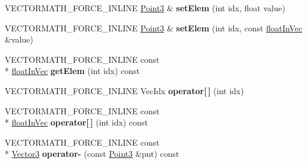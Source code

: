 \begin{DoxyCompactItemize}
\item 
\hypertarget{class_vectormath_1_1_aos_1_1_point3_ac8c59a40c872e7ead9fb897c3dc012fb}{V\+E\+C\+T\+O\+R\+M\+A\+T\+H\+\_\+\+F\+O\+R\+C\+E\+\_\+\+I\+N\+L\+I\+N\+E \hyperlink{class_vectormath_1_1_aos_1_1_point3}{Point3} \& {\bfseries set\+Elem} (int idx, float value)}\label{class_vectormath_1_1_aos_1_1_point3_ac8c59a40c872e7ead9fb897c3dc012fb}

\item 
\hypertarget{class_vectormath_1_1_aos_1_1_point3_acfaace337e3c100a7f36cdd336409634}{V\+E\+C\+T\+O\+R\+M\+A\+T\+H\+\_\+\+F\+O\+R\+C\+E\+\_\+\+I\+N\+L\+I\+N\+E \hyperlink{class_vectormath_1_1_aos_1_1_point3}{Point3} \& {\bfseries set\+Elem} (int idx, const \hyperlink{class_vectormath_1_1float_in_vec}{float\+In\+Vec} \&value)}\label{class_vectormath_1_1_aos_1_1_point3_acfaace337e3c100a7f36cdd336409634}

\item 
\hypertarget{class_vectormath_1_1_aos_1_1_point3_afb80aeb72784595b6beb84a09ad236bd}{V\+E\+C\+T\+O\+R\+M\+A\+T\+H\+\_\+\+F\+O\+R\+C\+E\+\_\+\+I\+N\+L\+I\+N\+E const \\*
\hyperlink{class_vectormath_1_1float_in_vec}{float\+In\+Vec} {\bfseries get\+Elem} (int idx) const }\label{class_vectormath_1_1_aos_1_1_point3_afb80aeb72784595b6beb84a09ad236bd}

\item 
\hypertarget{class_vectormath_1_1_aos_1_1_point3_aed1afecf3d4ac78dd3287f93eb548f8a}{V\+E\+C\+T\+O\+R\+M\+A\+T\+H\+\_\+\+F\+O\+R\+C\+E\+\_\+\+I\+N\+L\+I\+N\+E Vec\+Idx {\bfseries operator\mbox{[}$\,$\mbox{]}} (int idx)}\label{class_vectormath_1_1_aos_1_1_point3_aed1afecf3d4ac78dd3287f93eb548f8a}

\item 
\hypertarget{class_vectormath_1_1_aos_1_1_point3_a18475404c76492a1c0fd5b951942f356}{V\+E\+C\+T\+O\+R\+M\+A\+T\+H\+\_\+\+F\+O\+R\+C\+E\+\_\+\+I\+N\+L\+I\+N\+E const \\*
\hyperlink{class_vectormath_1_1float_in_vec}{float\+In\+Vec} {\bfseries operator\mbox{[}$\,$\mbox{]}} (int idx) const }\label{class_vectormath_1_1_aos_1_1_point3_a18475404c76492a1c0fd5b951942f356}

\item 
\hypertarget{class_vectormath_1_1_aos_1_1_point3_a07f2ca2ead80c0ad5e3e6580ac7a3c81}{V\+E\+C\+T\+O\+R\+M\+A\+T\+H\+\_\+\+F\+O\+R\+C\+E\+\_\+\+I\+N\+L\+I\+N\+E const \\*
\hyperlink{class_vectormath_1_1_aos_1_1_vector3}{Vector3} {\bfseries operator-\/} (const \hyperlink{class_vectormath_1_1_aos_1_1_point3}{Point3} \&pnt) const }\label{class_vectormath_1_1_aos_1_1_point3_a07f2ca2ead80c0ad5e3e6580ac7a3c81}


\end{DoxyCompactItemize}
